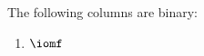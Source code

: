 The following columns are binary:
\begin{multicols}{1}
	\begin{enumerate}
		\item $\iomf$
	\end{enumerate}
\end{multicols}
